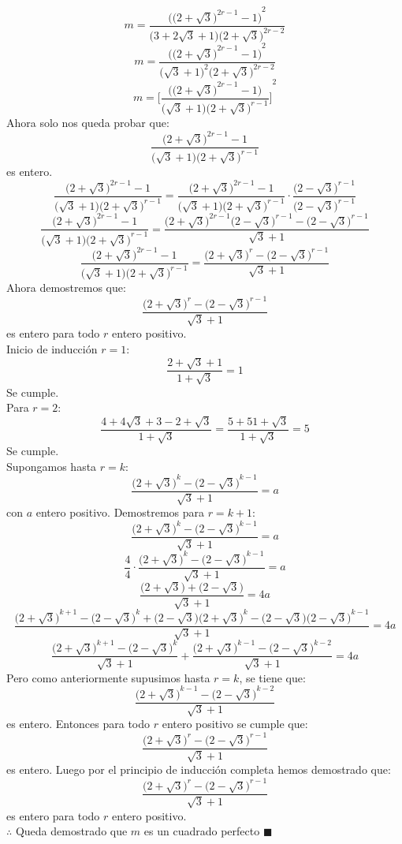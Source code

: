 \documentclass{book}
\begin{document}
\begin{enumerate}
$$m=\frac{{\Big({\big(2+\sqrt{3}\big)}^{2r-1}-1\Big)}^2}{ \big(3+2\sqrt{3}+1\big){\big(2+\sqrt{3}\big)}^{2r-2}}$$
$$m=\frac{{\Big({\big(2+\sqrt{3}\big)}^{2r-1}-1\Big)}^2}{{\big(\sqrt{3}+1\big)}^2{\big(2+\sqrt{3}\big)}^{2r-2}}$$
$$m={\Bigg[\frac{\Big({\big(2+\sqrt{3}\big)}^{2r-1}-1\Big)}{\big(\sqrt{3}+1\big){\big(2+\sqrt{3}\big)}^{r-1}}\Bigg]}^2$$
Ahora solo nos queda probar que:
$$\frac{{\big(2+\sqrt{3}\big)}^{2r-1}-1}{\big(\sqrt{3}+1\big){\big(2+\sqrt{3}\big)}^{r-1}}$$
es entero.
$$\frac{{\big(2+\sqrt{3}\big)}^{2r-1}-1}{\big(\sqrt{3}+1\big){\big(2+\sqrt{3}\big)}^{r-1}}=\frac{{\big(2+\sqrt{3}\big)}^{2r-1}-1}{\big(\sqrt{3}+1\big){\big(2+\sqrt{3}\big)}^{r-1}}\cdot\frac{{\big(2-\sqrt{3}\big)}^{r-1}}{{\big(2-\sqrt{3}\big)}^{r-1}}$$ 
$$\frac{{\big(2+\sqrt{3}\big)}^{2r-1}-1}{\big(\sqrt{3}+1\big){\big(2+\sqrt{3}\big)}^{r-1}}=\frac{{\big(2+\sqrt{3}\big)}^{2r-1}{\big(2-\sqrt{3}\big)}^{r-1}-{\big(2-\sqrt{3}\big)}^{r-1}}{\sqrt{3}+1}$$
$$\frac{{\big(2+\sqrt{3}\big)}^{2r-1}-1}{\big(\sqrt{3}+1\big){\big(2+\sqrt{3}\big)}^{r-1}}=\frac{{\big(2+\sqrt{3}\big)}^{r}-{\big(2-\sqrt{3}\big)}^{r-1}}{\sqrt{3}+1}$$
Ahora demostremos que:
$$\frac{{\big(2+\sqrt{3}\big)}^{r}-{\big(2-\sqrt{3}\big)}^{r-1}}{\sqrt{3}+1}$$
es entero para todo $r$ entero positivo.\\
Inicio de inducción $r=1$:
$$\frac{2+\sqrt{3}+1}{1+\sqrt{3}}=1$$
Se cumple.\\
Para $r=2$:   
$$\frac{4+4\sqrt{3}+3-2+\sqrt{3}}{1+\sqrt{3}}=\frac{5+51+\sqrt{3}}{1+\sqrt{3}}=5$$
Se cumple.\\
Supongamos hasta $r=k$:\\
$$\frac{{\big(2+\sqrt{3}\big)}^{k}-{\big(2-\sqrt{3}\big)}^{k-1}}{\sqrt{3}+1}=a$$
con $a$ entero positivo.
Demostremos  para $r=k+1$:
$$\frac{{\big(2+\sqrt{3}\big)}^{k}-{\big(2-\sqrt{3}\big)}^{k-1}}{\sqrt{3}+1}=a$$
$$\frac{4}{4}\cdot\frac{{\big(2+\sqrt{3}\big)}^{k}-{\big(2-\sqrt{3}\big)}^{k-1}}{\sqrt{3}+1}=a$$
$$\frac{\big(2+\sqrt{3}\big)+\big(2-\sqrt{3}\big)}{\sqrt{3}+1}=4a$$
$$\frac{{\big(2+\sqrt{3}\big)}^{k+1}-{\big(2-\sqrt{3}\big)}^{k}+\big(2-\sqrt{3}\big){\big(2+\sqrt{3}\big)}^{k}-\big(2-\sqrt{3}\big){\big(2-\sqrt{3}\big)}^{k-1}}{\sqrt{3}+1}=4a$$
$$\frac{{\big(2+\sqrt{3}\big)}^{k+1}-{\big(2-\sqrt{3}\big)}^{k}}{\sqrt{3}+1}+\frac{{\big(2+\sqrt{3}\big)}^{k-1}-{\big(2-\sqrt{3}\big)}^{k-2}}{\sqrt{3}+1}=4a$$
Pero como anteriormente supusimos hasta $r=k$, se tiene que:
$$\frac{{\big(2+\sqrt{3}\big)}^{k-1}-{\big(2-\sqrt{3}\big)}^{k-2}}{\sqrt{3}+1}$$
es entero. Entonces para todo $r$ entero positivo se cumple que:
$$\frac{{\big(2+\sqrt{3}\big)}^{r}-{\big(2-\sqrt{3}\big)}^{r-1}}{\sqrt{3}+1}$$
es entero. Luego por el principio de inducción completa hemos demostrado que:
$$\frac{{\big(2+\sqrt{3}\big)}^{r}-{\big(2-\sqrt{3}\big)}^{r-1}}{\sqrt{3}+1}$$
es entero para todo $r$ entero positivo.\\
$\therefore$ Queda demostrado que $m$ es un cuadrado perfecto $\blacksquare$
		\end{enumerate}
		
\end{document}
